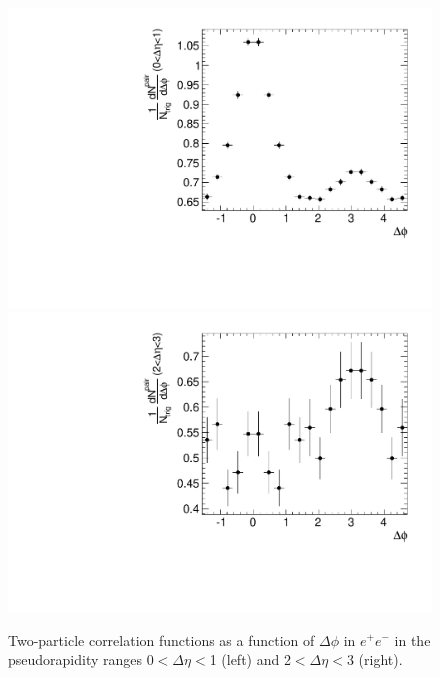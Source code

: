\begin{figure}[!htb]
\begin{center}
\includegraphics[width=.45\textwidth]{figures/canvasProjection_isBelle1_mult50_eta01.pdf}
\includegraphics[width=.45\textwidth]{figures/canvasProjection_isBelle1_mult50_eta23.pdf}
\caption{Two-particle correlation functions as a function of  $\Delta\phi$ in $e^{+}e^{-}$ in the pseudorapidity ranges 0$<\Delta \eta<$1 (left) and 2$<\Delta \eta<$3 (right).}
\label{fig:ProjectionMult50} 
\end{center}
\end{figure}

